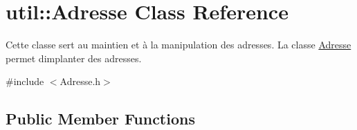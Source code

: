 \hypertarget{classutil_1_1Adresse}{}\section{util\+:\+:Adresse Class Reference}
\label{classutil_1_1Adresse}


Cette classe sert au maintien et à la manipulation des adresses. La classe \hyperlink{classutil_1_1Adresse}{Adresse} permet d\textquotesingle{}implanter des adresses.  




{\ttfamily \#include $<$Adresse.\+h$>$}

\subsection*{Public Member Functions}
